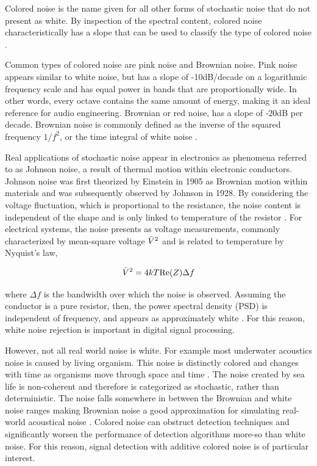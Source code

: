             Colored noise is the name given for all other forms of stochastic noise that do not present as white. By inspection of the spectral content, colored noise characteristically has a slope that can be used to classify the type of colored noise \cite{kasdin_discrete_1995}.
            
            Common types of colored noise are pink noise and Brownian noise. Pink noise appears similar to white noise, but has a slope of -10dB/decade on a logarithmic frequency scale and has equal power in bands that are proportionally wide. In other words, every octave contains the same amount of energy, making it an ideal reference for audio engineering. Brownian or red noise, has a slope of -20dB per decade. Brownian noise is commonly defined as the inverse of the squared frequency $1/f^2$, or the time integral of white noise \cite{barnes_statistical_1966}. 

            Real applications of stochastic noise appear in electronics as phenomena referred to as Johnson noise, a result of thermal motion within electronic conductors. Johnson noise was first theorized by Einstein in 1905 as Brownian motion within materials\cite{einstein_-investigations_nodate} and was subsequently observed by Johnson in 1928. By considering the voltage fluctuation, which is proportional to the resistance, the noise content is independent of the shape and is only linked to temperature of the resistor \cite{johnson_thermal_1928}. For electrical systems, the noise presents as voltage measurements, commonly characterized by mean-square voltage $\Bar{V}^2$ and is related to temperature by Nyquist's law,

            \begin{equation}
                \Bar{V}^2 = 4kT\text{Re}(Z) \Delta f
            \end{equation}

            where $\Delta f$ is the bandwidth over which the noise is observed. Assuming the conductor is a pure resistor, then, the power spectral density (PSD) is independent of frequency, and appears as approximately white \cite{qu_johnson_2019} \cite{perepelitsa_johnson_nodate}. For this reason, white noise rejection is important in digital signal processing.

            However, not all real world noise is white. For example most underwater acoustics noise is caused by living organism. This noise is distinctly colored and changes with time as organisms move through space and time \cite{benoit-bird_remote_2021}. The noise created by sea life is non-coherent and therefore is categorized as stochastic, rather than deterministic. The noise falls somewhere in between the Brownian and white noise ranges making Brownian noise a good approximation for simulating real-world acoustical noise \cite{deeks_nonlinear_2017}. Colored noise can obstruct detection techniques and significantly worsen the performance of detection algorithms more-so than white noise. For this reason, signal detection with additive colored noise is of particular interest. 
            
